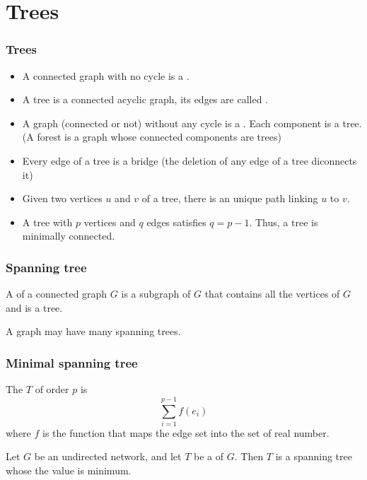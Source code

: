\documentclass[aspectratio=43]{beamer}
\begin{document}
\section{Trees}

\begin{frame}\frametitle{Trees}
	\begin{definition}
	\begin{itemize}
	\item A connected graph with no cycle is a .
	\item A tree is a connected acyclic graph, its edges are called .
	\item A graph (connected or not) without any cycle is a . Each component is a tree. (A forest is a graph whose connected components are trees)
	\end{itemize}
	\end{definition}

	\begin{theorem}[{Properties}]
	\begin{itemize}
	\item Every edge of a tree is a bridge (the deletion of any edge of a tree diconnects it)
	\item Given two vertices $u $ and $v$ of a tree, there is an unique path linking $u$ to $v$.
	\item A tree with $p$ vertices and $q$ edges satisfies $q=p-1$. Thus, a tree is minimally connected. 
	\end{itemize}
	\end{theorem}
\end{frame}


\begin{frame}\frametitle{Spanning tree}
	\begin{definition}
	A  of a connected graph $G$ is a subgraph of $G$ that contains all the vertices of $G$ and is a tree.
	\end{definition}
	A graph may have many spanning trees.
\end{frame}


\begin{frame}\frametitle{Minimal spanning tree}
	\begin{definition}
	The  $T$ of order $p$ is
	$$\sum_{i=1}^{p-1}f(e_i)$$
	where $f$ is the function that maps the edge set into the set of real number.
	\end{definition}
	\begin{definition}
	Let $G$ be an undirected network, and let $T$ be a  of $G$. Then $T$ is a spanning tree whose the value is minimum.
	\end{definition}
\end{frame}
\end{document}
